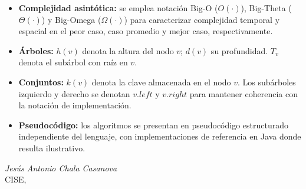 \begin{itemize}
    \item \textbf{Complejidad asintótica:} se emplea notación Big-O ($O(\cdot)$),
          Big-Theta ($\Theta(\cdot)$) y Big-Omega ($\Omega(\cdot)$) para caracterizar
          complejidad temporal y espacial en el peor caso, caso promedio y mejor caso,
          respectivamente.
    \item \textbf{Árboles:} $h(v)$ denota la altura del nodo $v$; $d(v)$ su profundidad.
          $T_v$ denota el subárbol con raíz en $v$.
    \item \textbf{Conjuntos:} $k(v)$ denota la clave almacenada en el nodo $v$.
          Los subárboles izquierdo y derecho se denotan $v.\mathit{left}$ y
          $v.\mathit{right}$ para mantener coherencia con la notación de implementación.
    \item \textbf{Pseudocódigo:} los algoritmos se presentan en pseudocódigo estructurado
          independiente del lenguaje, con implementaciones de referencia en Java donde
          resulta ilustrativo.
\end{itemize}

\vspace{1.2cm}
\begin{flushright}
\textit{Jesús Antonio Chala Casanova}\\[2pt]
CISE, \the\year
\end{flushright}
